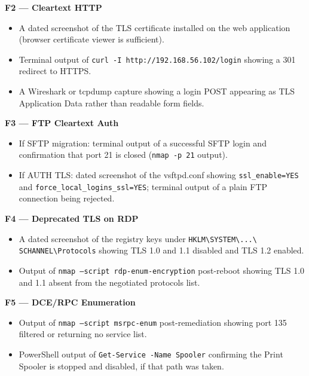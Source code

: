 \documentclass[12pt]{article}
\begin{document}
\bigskip
 
\noindent\textbf{F2 --- Cleartext HTTP}
 
\begin{itemize}[leftmargin=1.5em, itemsep=4pt]
  \item A dated screenshot of the TLS certificate installed on the web
    application (browser certificate viewer is sufficient).
  \item Terminal output of \texttt{curl -I http://192.168.56.102/login}
    showing a 301 redirect to HTTPS.
  \item A Wireshark or tcpdump capture showing a login POST appearing as
    TLS Application Data rather than readable form fields.
\end{itemize}
 
\bigskip
 
\noindent\textbf{F3 --- FTP Cleartext Auth}
 
\begin{itemize}[leftmargin=1.5em, itemsep=4pt]
  \item If SFTP migration: terminal output of a successful SFTP login and
    confirmation that port 21 is closed (\texttt{nmap -p 21} output).
  \item If AUTH TLS: dated screenshot of the vsftpd.conf showing
    \texttt{ssl\_enable=YES} and \texttt{force\_local\_logins\_ssl=YES};
    terminal output of a plain FTP connection being rejected.
\end{itemize}
 
\bigskip
 
\noindent\textbf{F4 --- Deprecated TLS on RDP}
 
\begin{itemize}[leftmargin=1.5em, itemsep=4pt]
  \item A dated screenshot of the registry keys under
    \texttt{HKLM\textbackslash SYSTEM\textbackslash ...\textbackslash
    SCHANNEL\textbackslash Protocols} showing TLS 1.0 and 1.1 disabled
    and TLS 1.2 enabled.
  \item Output of \texttt{nmap --script rdp-enum-encryption} post-reboot
    showing TLS 1.0 and 1.1 absent from the negotiated protocols list.
\end{itemize}
 
\bigskip
 
\noindent\textbf{F5 --- DCE/RPC Enumeration}
 
\begin{itemize}[leftmargin=1.5em, itemsep=4pt]
  \item Output of \texttt{nmap --script msrpc-enum} post-remediation
    showing port 135 filtered or returning no service list.
  \item PowerShell output of \texttt{Get-Service -Name Spooler} confirming
    the Print Spooler is stopped and disabled, if that path was taken.
\end{itemize}
 
\end{document}
